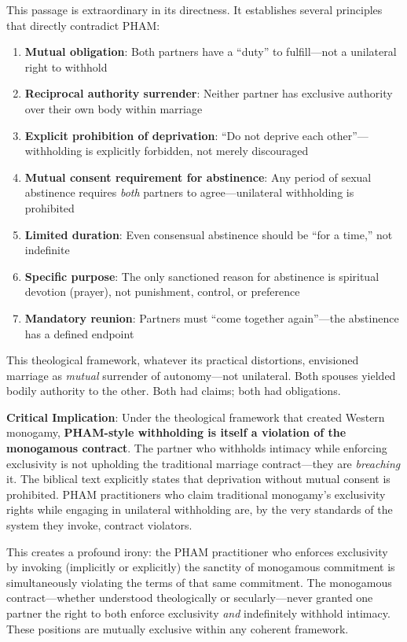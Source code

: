 \documentclass[12pt,openany]{book}
\numberwithin{equation}{chapter}
\begin{document}
This passage is extraordinary in its directness. It establishes several principles that directly contradict PHAM:

\begin{enumerate}
    \item \textbf{Mutual obligation}: Both partners have a ``duty'' to fulfill---not a unilateral right to withhold
    \item \textbf{Reciprocal authority surrender}: Neither partner has exclusive authority over their own body within marriage
    \item \textbf{Explicit prohibition of deprivation}: ``Do not deprive each other''---withholding is explicitly forbidden, not merely discouraged
    \item \textbf{Mutual consent requirement for abstinence}: Any period of sexual abstinence requires \textit{both} partners to agree---unilateral withholding is prohibited
    \item \textbf{Limited duration}: Even consensual abstinence should be ``for a time,'' not indefinite
    \item \textbf{Specific purpose}: The only sanctioned reason for abstinence is spiritual devotion (prayer), not punishment, control, or preference
    \item \textbf{Mandatory reunion}: Partners must ``come together again''---the abstinence has a defined endpoint
\end{enumerate}

This theological framework, whatever its practical distortions, envisioned marriage as \textit{mutual} surrender of autonomy---not unilateral. Both spouses yielded bodily authority to the other. Both had claims; both had obligations.

\textbf{Critical Implication}: Under the theological framework that created Western monogamy, \textbf{PHAM-style withholding is itself a violation of the monogamous contract}. The partner who withholds intimacy while enforcing exclusivity is not upholding the traditional marriage contract---they are \textit{breaching} it. The biblical text explicitly states that deprivation without mutual consent is prohibited. PHAM practitioners who claim traditional monogamy's exclusivity rights while engaging in unilateral withholding are, by the very standards of the system they invoke, contract violators.

This creates a profound irony: the PHAM practitioner who enforces exclusivity by invoking (implicitly or explicitly) the sanctity of monogamous commitment is simultaneously violating the terms of that same commitment. The monogamous contract---whether understood theologically or secularly---never granted one partner the right to both enforce exclusivity \textit{and} indefinitely withhold intimacy. These positions are mutually exclusive within any coherent framework.
\end{document}
